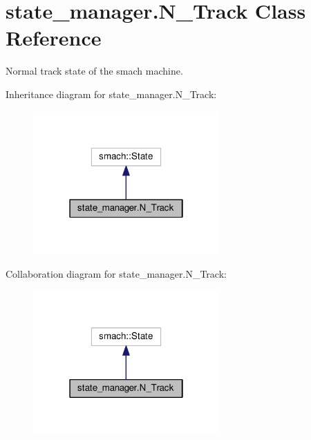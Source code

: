 \hypertarget{classstate__manager_1_1N__Track}{}\section{state\+\_\+manager.\+N\+\_\+\+Track Class Reference}
\label{classstate__manager_1_1N__Track}


Normal track state of the smach machine.  




Inheritance diagram for state\+\_\+manager.\+N\+\_\+\+Track\+:\nopagebreak
\begin{figure}[H]
\begin{center}
\leavevmode
\includegraphics[width=202pt]{classstate__manager_1_1N__Track__inherit__graph}
\end{center}
\end{figure}


Collaboration diagram for state\+\_\+manager.\+N\+\_\+\+Track\+:\nopagebreak
\begin{figure}[H]
\begin{center}
\leavevmode
\includegraphics[width=202pt]{classstate__manager_1_1N__Track__coll__graph}
\end{center}
\end{figure}
